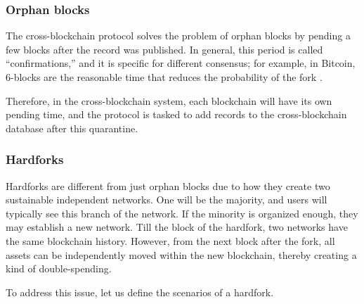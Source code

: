\begin{multicols}{2}
\subsubsection{Orphan blocks}\label{subsubsec-4.3.3}

The cross-blockchain protocol solves the problem of orphan blocks by pending a few blocks after the record was published. In general, this period is called “confirmations,” and it is specific for different consensus; for example, in Bitcoin, 6-blocks are the reasonable time that reduces the probability of the fork \cite{art1-key40}.

Therefore, in the cross-blockchain system, each blockchain will have its own pending time, and the protocol is tasked to add records to the cross-blockchain database after this quarantine.

\subsubsection{Hardforks}\label{subsubsec-4.3.4}

Hardforks are different from just orphan blocks due to how they create two sustainable independent networks. One will be the majority, and users will typically see this branch of the network. If the minority is organized enough, they may establish a new network. Till the block of the hardfork, two networks have the same blockchain history. However, from the next block after the fork, all assets can be independently moved within the new blockchain, thereby creating a kind of double-spending.

To address this issue, let us define the scenarios of a hardfork.


\end{multicols}
